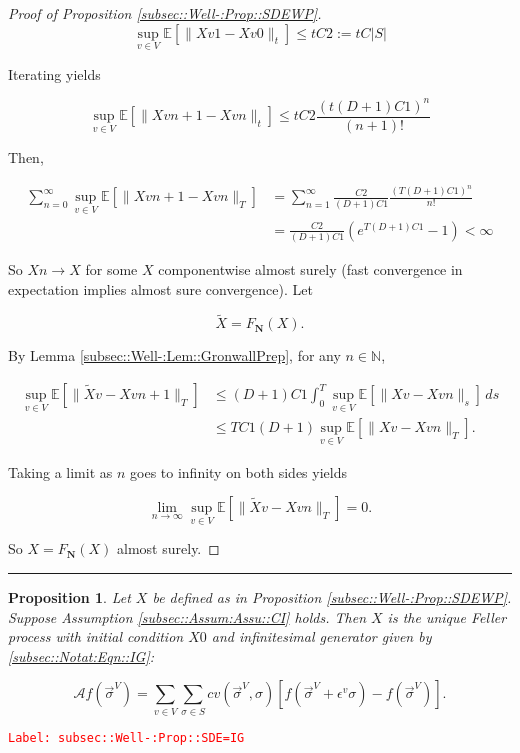 \documentclass[12pt]{article}
\newcommand{\mb}{\mathbb}
\newcommand{\mc}{\mathcal}
\newcommand{\ra}{\rightarrow}
\newcommand{\ep}{\epsilon}
\newcommand{\tr}{\textcolor{red}}
\newcommand{\labe}[1]{\tr{\texttt{Label: #1}}}
\newcommand{\lin}{\rule{\linewidth}{0.4 pt}}
\newcommand{\ex}[1]{\mb{E}\left[#1\right]}			%
\newcommand{\defeq}{:=}								%
\renewcommand{\v}{v}							%
\renewcommand{\S}{S}							%
\newcommand{\s}{\sigma}							%
\newcommand{\sv}{\vec{\s}}						%
\newcommand{\ev}{\ep}							%
\newcommand{\T}{T}								%
\renewcommand{\t}{t}							%
\renewcommand{\tt}{s}							%
\newcommand{\X}{X}								%
\newcommand{\IG}{\mc{A}}						%
\newcommand{\IGr}{c}							%
\newcommand{\vind}[1]{^{#1}}					%
\newcommand{\vsi}[1]{^{#1}}						%
\newcommand{\cind}[1]{_{#1}}					%
\newcommand{\const}{C}							%
\newcommand{\degr}{D}							%
\newcommand{\poisses}{\mathbf{N}}				%
\newcommand{\Fpo}{F_{\poisses}}					%
\newcommand{\alt}[1]{\widetilde{#1}}			%
\newtheorem{prop}[thms]{Proposition}
\begin{document}
\begin{proof}[Proof of Proposition \ref{subsec::Well-:Prop::SDEWP}]
\[\sup_{\v \in V}\ex{\|\X{\v}{}{1} - \X{\v}{}{0}\|_\t} \leq \t\const{2} \defeq \t\const{}|\S|\]

Iterating yields

\[\sup_{\v \in V} \ex{\|\X{\v}{}{n+1} - \X{\v}{}{n}\|_\t} \leq \t\const{2}\frac{(\t(\degr+1)\const{1})^n}{(n+1)!}\]

Then,

\begin{align*}
\sum_{n=0}^\infty \sup_{\v \in V} \ex{\|\X{\v}{}{n+1} - \X{\v}{}{n}\|_\T} &= \sum_{n=1}^\infty \frac{\const{2}}{(\degr+1)\const{1}}\frac{(\T(\degr+1)\const{1})^{n}}{n !}\\
& = \frac{\const{2}}{(\degr+1)\const{1}}(e^{\T(\degr+1)\const{1}} - 1) < \infty
\end{align*}


So \(\X{}{}{n} \ra \X{}{}\) for some \(\X{}{}\) componentwise almost surely (fast convergence in expectation implies almost sure convergence). Let 

\[\alt{\X}{}{} = \Fpo(\X{}{}).\]

By Lemma \ref{subsec::Well-:Lem::GronwallPrep}, for any \(n\in\mb{N}\),

\begin{align*}
\sup_{\v \in V} \ex{\|\alt{\X}{\v}{} - \X{\v}{}{n+1}\|_\T} &\leq (\degr+1)\const{1}\int_0^\T \sup_{\v \in V}\ex{\|\X{\v}{} - \X{\v}{}{n}\|_\tt}\,d\tt \\
&\leq \T\const{1}(\degr+1)\sup_{\v\in V} \ex{\|\X{\v}{} - \X{\v}{}{n}\|_\T}.
\end{align*}

Taking a limit as \(n\) goes to infinity on both sides yields

\[\lim_{n\ra\infty} \sup_{\v \in V} \ex{\|\alt{\X}{\v}{} - \X{\v}{}{n}\|_\T} = 0.\]

So \(\X{}{}= \Fpo(\X{}{})\) almost surely.
\end{proof}

\lin

\begin{prop}
Let \(\X{}{}\) be defined as in Proposition \ref{subsec::Well-:Prop::SDEWP}. Suppose Assumption \ref{subsec::Assum:Assu::CI} holds. Then \(\X{}{}\) is the unique Feller process with initial condition \(\X{}{0}\) and infinitesimal generator given by \eqref{subsec::Notat:Eqn::IG}:

\[\IG f(\sv\cind{}\vsi{V}) = \sum_{\v\in V}\sum_{\s \in \S} \IGr{\v}(\sv\cind{}\vsi{V},\s)[f(\sv\cind{}\vsi{V} + \ev\vind{\v}\s) - f(\sv\cind{}\vsi{V})].\]
\label{subsec::Well-:Prop::SDE=IG}
\end{prop}
\labe{subsec::Well-:Prop::SDE=IG}
\end{document}
